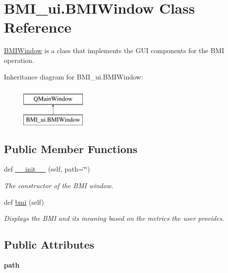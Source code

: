 \hypertarget{class_b_m_i__ui_1_1_b_m_i_window}{}\section{B\+M\+I\+\_\+ui.\+B\+M\+I\+Window Class Reference}
\label{class_b_m_i__ui_1_1_b_m_i_window}


\hyperlink{class_b_m_i__ui_1_1_b_m_i_window}{B\+M\+I\+Window} is a class that implements the G\+UI components for the B\+MI operation.  


Inheritance diagram for B\+M\+I\+\_\+ui.\+B\+M\+I\+Window\+:\begin{figure}[H]
\begin{center}
\leavevmode
\includegraphics[height=2.000000cm]{class_b_m_i__ui_1_1_b_m_i_window}
\end{center}
\end{figure}
\subsection*{Public Member Functions}
\begin{DoxyCompactItemize}
\item 
def \hyperlink{class_b_m_i__ui_1_1_b_m_i_window_a0a248356e06771e32f78f0e7933d066f}{\+\_\+\+\_\+init\+\_\+\+\_\+} (self, path=\char`\"{}\char`\"{})
\begin{DoxyCompactList}\small\item\em The constructor of the B\+MI window. \end{DoxyCompactList}\item 
def \hyperlink{class_b_m_i__ui_1_1_b_m_i_window_ad8708c4a841a95a31c9f9d117f4440b2}{bmi} (self)
\begin{DoxyCompactList}\small\item\em Displays the B\+MI and its meaning based on the metrics the user provides. \end{DoxyCompactList}\end{DoxyCompactItemize}
\subsection*{Public Attributes}
\begin{DoxyCompactItemize}
\item 
\mbox{\label{class_b_m_i__ui_1_1_b_m_i_window_a54aca672beae5ffa1e6e6eb51cefe459}} 
{\bfseries path}
\end{DoxyCompactItemize}


